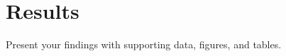 \section{Results}
\label{sec:results}

Present your findings with supporting data, figures, and tables.

